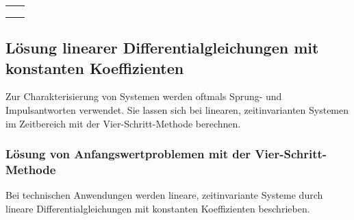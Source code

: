 \begin{table}[H]
{\begin{tabular}{| c | c |}
\parbox[c][0.64in][c]{3.3in}{} & 
\parbox[c][0.64in][c]{3.3in}{}\\ \hline

\parbox[c][0.64in][c]{3.3in}{} & 
\parbox[c][0.64in][c]{3.3in}{}\\ \hline

\parbox[c][0.8in][c]{3.3in}{} & 
\parbox[c][0.8in][c]{3.3in}{}\\ \hline

\parbox[c][0.64in][c]{3.3in}{} & 
\parbox[c][0.64in][c]{3.3in}{}\\ \hline

\end{tabular}%
}
\label{tab:threefour}
\end{table}

\clearpage

\subsection{Lösung linearer Differentialgleichungen mit konstanten Koeffizienten}\label{threethree}
Zur Charakterisierung von Systemen werden oftmals Sprung- und Impulsantworten verwendet. Sie lassen sich bei linearen, zeitinvarianten Systemen im Zeitbereich mit der Vier-Schritt-Methode berechnen.

\subsubsection{Lösung von Anfangswertproblemen mit der Vier-Schritt-Methode}
Bei technischen Anwendungen werden lineare, zeitinvariante Systeme durch lineare Differentialgleichungen mit konstanten Koeffizienten beschrieben.


